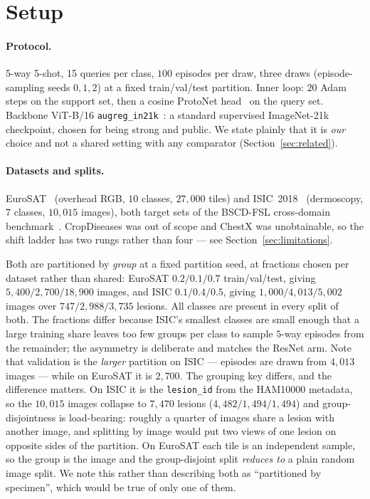 \documentclass[11pt]{article}
\begin{document}
\section{Setup}

\paragraph{Protocol.} 5-way 5-shot, 15 queries per class, $100$ episodes per draw,
three draws (episode-sampling seeds $0,1,2$) at a fixed train/val/test partition.
Inner loop: $20$ Adam steps on the support set, then a cosine ProtoNet head~\cite{snell2017} on the
query set. Backbone ViT-B/16 \texttt{augreg\_in21k}~\cite{dosovitskiy2021,steiner2022}:
a standard supervised ImageNet-21k checkpoint, chosen for being strong and public. We
state plainly that it is \emph{our} choice and not a shared setting with any comparator
(Section~\ref{sec:related}).

\paragraph{Datasets and splits.} EuroSAT~\cite{helber2019} (overhead RGB, $10$ classes,
$27{,}000$ tiles) and ISIC~2018~\cite{tschandl2018,codella2019} (dermoscopy, $7$ classes,
$10{,}015$ images), both target sets of the BSCD-FSL cross-domain
benchmark~\cite{guo2020}. CropDiseases was out of scope and ChestX was unobtainable, so
the shift ladder has two rungs rather than four --- see Section~\ref{sec:limitations}.

Both are partitioned by \emph{group} at a fixed partition seed, at fractions chosen per
dataset rather than shared: EuroSAT $0.2/0.1/0.7$ train/val/test, giving
$5{,}400/2{,}700/18{,}900$ images, and ISIC $0.1/0.4/0.5$, giving
$1{,}000/4{,}013/5{,}002$ images over $747/2{,}988/3{,}735$ lesions. All classes are
present in every split of both. The fractions differ because ISIC's smallest classes are
small enough that a large training share leaves too few groups per class to sample
$5$-way episodes from the remainder; the asymmetry is deliberate and matches the
ResNet arm. Note that validation is the \emph{larger} partition on ISIC --- episodes are
drawn from $4{,}013$ images --- while on EuroSAT it is $2{,}700$.
The grouping key differs, and the difference matters. On ISIC it is the \texttt{lesion\_id}
from the HAM10000 metadata, so the $10{,}015$ images collapse to $7{,}470$ lesions
($4{,}482/1{,}494/1{,}494$) and group-disjointness is load-bearing: roughly a quarter of
images share a lesion with another image, and splitting by image would put two views of
one lesion on opposite sides of the partition. On EuroSAT each tile is an independent
sample, so the group is the image and the group-disjoint split \emph{reduces to} a plain
random image split. We note this rather than describing both as ``partitioned by
specimen'', which would be true of only one of them.
\end{document}
